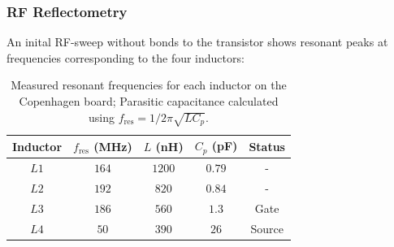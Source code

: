 \documentclass{beamer}
\begin{document}
\begin{frame}
    \frametitle{RF Reflectometry}

    An inital RF-sweep without bonds to the transistor shows resonant peaks at frequencies corresponding to the four inductors:

    \begin{table}[htp]
        \centering
        \begin{tabular}{| c | c  | c | c | c |}
            \hline
            Inductor & $f_\mathrm{res}$ (\si{\mega\hertz}) & $L$ (\si{\nano\henry}) & $C_p$ (\si{\pico\farad}) & Status \\[0.5ex]
            \hline \hline
            $L1$     & $164$                               & $1200$                 & $0.79$                   & -      \\
            $L2$     & $192$                               & $820$                  & $0.84$                   & -      \\
            $L3$     & $186$                               & $560$                  & $1.3$                    & Gate   \\
            $L4$     & $50$                                & $390$                  & $26$                     & Source \\ \hline
        \end{tabular}
        \caption{Measured resonant frequencies for each inductor on the Copenhagen board; Parasitic capacitance calculated using $f_\mathrm{res} = 1/2\pi\sqrt{LC_p}$.}
        \label{table:capacitances}
    \end{table}

\end{frame}
\end{document}
